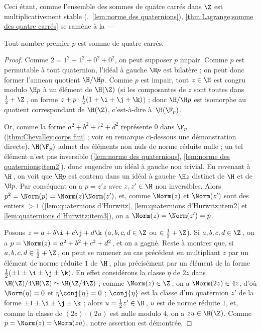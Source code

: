 \documentclass[11pt, %
  title in boldface,
  theorem in new line,
  theorem numbering = section,
  number theorems separately,
  simple name,
]{beaulivre}
\begin{document}
    Ceci étant, comme l'ensemble des sommes de quatre carrés dans \( \Z \) est multiplicativement stable (\cf.~\cref{lem:norme des quaternions}), \cref{thm:Lagrange;somme des quatre carrés} se ramène à la ---
    \begin{proposition}
        Tout nombre premier \( p \) est somme de quatre carrés.
    \end{proposition}
    \begin{proof}
        Comme \( 2 = 1^2+1^2+0^2+0^2 \), on peut supposer \( p \) impair. Comme \( p \) est permutable à tout quaternion, l'idéal à gauche \( \H p \) est bilatère ; on peut donc former l'anneau quotient \( \H / \H p \). Comme \( p \) est impair, tout \( z \in \H \) est congru modulo \( \H p \) à un élément de \( \H(\Z) \) (si les composantes de \( z \) sont toutes dans \( \frac{1}{2}+\Z \)\,, on forme \( z + p \cdot \frac{1}{2}(1+\i+\j+\k) \)) ; donc \( \H / \H p \) est isomorphe au quotient correspondant de \( \H(\Z) \), c'est-à-dire à~\( \H(\F_p) \).

        Or, comme la forme \( a^2+b^2+c^2+d^2 \) représente \( 0 \) dans \( \F_p \) (\cref{thm:Chevalley;corps fini} ; voir en remarque ci-dessous une démonstration directe), \( \H(\F_p) \) admet des éléments non nuls de norme réduite nulle ; un tel élément n'est pas inversible (\cref{lem:norme des quaternions}, \ref{lem:norme des quaternions;item2}), donc engendre un idéal à gauche non trivial. En revenant à \( \H \)\,, on voit que \( \H p \) est contenu dans un idéal à gauche \( \H z \) distinct de \( \H \) et de \( \H p \). Par conséquent on a \( p = z' z \) avec \( z,z' \in \H \) non inversibles. Alors \( p^2 = \Norm(p) = \Norm(z)\Norm(z') \), et, comme \( \Norm(z) \) et \( \Norm(z') \) sont des entiers \( > 1 \) (\cref{lem:quaternions d'Hurwitz}, \ref{lem:quaternions d'Hurwitz;item2} et \ref{lem:quaternions d'Hurwitz;item3}), on a \( \Norm(z) = \Norm(z') = p \).

        Posons \( z = a+b\i+c\j+d\k \) (\( a,b,c,d \in \Z \) ou \( \in \frac{1}{2}+\Z \)). Si \( a,b,c,d \in \Z \)\,, on a \( p = \Norm(z) = a^2+b^2+c^2+d^2 \), et on a gagné. Reste à montrer que, si \( a,b,c,d \in \frac{1}{2}+\Z \)\,, on peut se ramener au cas précédent en multipliant \( z \) par un élément de norme réduite \( 1 \) de \( \H \)\,, plus précisément par un élément de la forme \( \frac{1}{2}(\pm 1 \pm \i \pm \j \pm \k) \). En effet considérons la classe \( \eta \) de \( 2z \) dans \( \H(\Z)/4\H(\Z) \simeq \H(\Z/4\Z) \) ; comme \( \Norm(z) \in \Z \)\,, on a \( \Norm(2z) \in 4z \), d'où \( \Norm(\eta) = 0 \) et \( \eta \conj{\eta} = 0 \) ; \( \conj{\eta} \) est la classe d'un quaternion \( z' \) de la forme \( \pm 1 \pm \i \pm \j \pm \k \) ; alors \( u = \frac{1}{2}z' \in \H \)\,, \( u \) est de norme réduite \( 1 \), et, comme la classe de \( (2z)\cdot(2u) \) est nulle modulo \( 4 \), on a \( zu \in \H(\Z) \). Comme \( p = \Norm(z) = \Norm(zu) \), notre assertion est démontrée.
    \end{proof}
\end{document}
